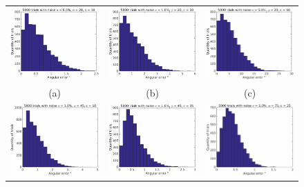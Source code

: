 \documentclass{report}
\begin{document}
\begin{figure}
  \centering
  \begin{tabular}{ccc}
  \includegraphics[width=0.30\linewidth]{q4_error_el_20_dev_10_noise_0_005000.pdf} &
  \includegraphics[width=0.30\linewidth]{q4_error_el_20_dev_10_noise_0_010000.pdf} &
  \includegraphics[width=0.30\linewidth]{q4_error_el_20_dev_10_noise_0_050000.pdf} \\
  (a) &
  (b) &
  (c) \\
  \includegraphics[width=0.30\linewidth]{q4_error_el_45_dev_10_noise_0_010000.pdf} &
  \includegraphics[width=0.30\linewidth]{q4_error_el_45_dev_35_noise_0_010000.pdf} &
  \includegraphics[width=0.30\linewidth]{q4_error_el_75_dev_25_noise_0_010000.pdf} \\

\end{tabular}
\end{figure}
\end{document}
